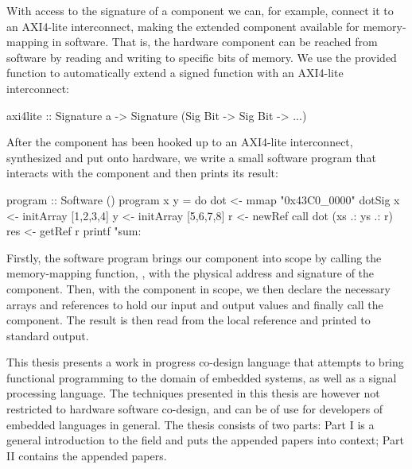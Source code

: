 \documentclass[../paper.tex]{subfiles}
\begin{document}
With access to the signature of a component we can, for example, connect it to an AXI4-lite interconnect, making the extended component available for memory-mapping in software. That is, the hardware component can be reached from software by reading and writing to specific bits of memory. We use the provided  function to automatically extend a signed function with an AXI4-lite interconnect:



\begin{code}
axi4lite :: Signature a -> Signature (Sig Bit -> Sig Bit -> ...)
\end{code}

After the component has been hooked up to an AXI4-lite interconnect, synthesized and put onto hardware, we write a small software program that interacts with the component and then prints its result:

\begin{code}
program :: Software ()
program x y = do
  dot <- mmap "0x43C0_0000" dotSig
  x   <- initArray [1,2,3,4]
  y   <- initArray [5,6,7,8]
  r   <- newRef
  call dot (xs .: ys .: r)
  res <- getRef r
  printf "sum: %
\end{code}

\noindent Firstly, the software program brings our component into scope by calling the memory-mapping function, , with the physical address and signature of the component. Then, with the component in scope, we then declare the necessary arrays and references to hold our input and output values and finally call the component. The result is then read from the local reference and printed to standard output.

This thesis presents a work in progress co-design language that attempts to bring functional programming to the domain of embedded systems, as well as a signal processing language. The techniques presented in this thesis are however not restricted to hardware software co-design, and can be of use for developers of embedded languages in general. The thesis consists of two parts: Part I is a general introduction to the field and puts the appended papers into context; Part II contains the appended papers.

\end{document}
